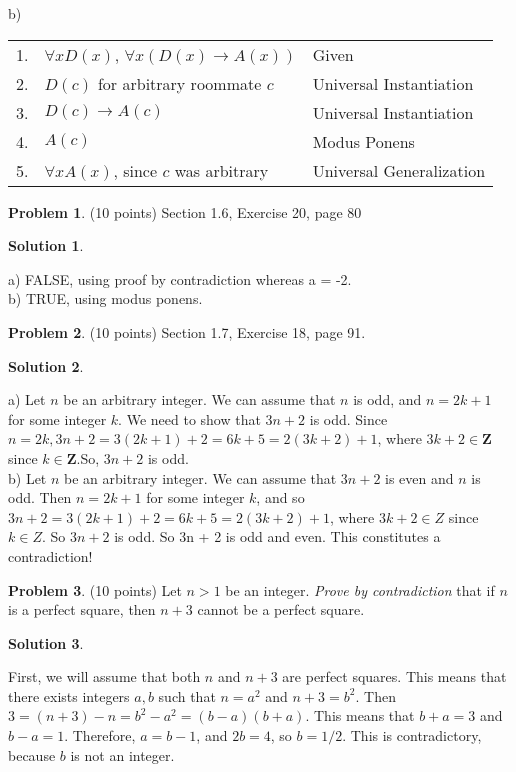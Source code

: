 \documentclass{article}
\theoremstyle{definition}
\newtheorem{problem}{Problem}
\newtheorem*{solution}{Solution}
\newcommand{\Z}{\mathbf{Z}}
\begin{document}
				b) 	\begin{tabular}{| l | l | l |} \hline
					1. & $\forall xD(x)$, $\forall x(D(x) \rightarrow A(x))$		& Given \\
					2. & $D(c)$ for arbitrary roommate $c$ 				& Universal Instantiation \\
					3. & $D(c) \rightarrow A(c) $						& Universal Instantiation \\
					4. & $A(c)$									& Modus Ponens \\
					5. & $\forall xA(x)$, since $c$ was arbitrary			& Universal Generalization \\
					\hline
					\end{tabular}

\begin{problem} (10 points)
Section 1.6, Exercise 20, page 80
\end{problem}
\begin{solution}
\end{solution}		\noindent a) FALSE, using proof by contradiction whereas a = -2. \\
				b) TRUE, using modus ponens.

\begin{problem} (10 points)
Section 1.7, Exercise 18, page 91.
\end{problem}
\begin{solution}
\end{solution}		\noindent a) Let $n$ be an arbitrary integer. We can assume that $n$ is odd, and $n = 2k					+1$ for some integer $k$. We need to show that $3n+2$ is odd. Since $n = 2k, 3n+2 = 3(2k				+1)+2 = 6k+5 = 2(3k+2)+1$, where $3k+2 \in\Z$ since $k \in \Z. $So, $3n+2$ is odd. \\ 

				\noindent b) Let $n$ be an arbitrary integer. We can assume that $3n + 2$ is 							even and $n$ is odd. Then $n = 2k + 1$ for some integer $k$, and so $3n + 2 = 3(2k + 1) + 				2 = 6k + 5 = 2(3k + 2) + 1$, where $3k + 2 \in Z$ since $k \in Z$. So $3n + 2$ is odd. So 3n 				+ 2 is odd and even. This constitutes a contradiction!

\begin{problem} (10 points)
Let $n>1$ be an integer. \textsl{Prove by contradiction} that if $n$ is a perfect square, then
$n+3$ cannot be a perfect square. 
\end{problem}
\begin{solution}
\end{solution}		\noindent First, we will assume that both $n$ and $n+3$ are perfect squares. This means 					that there exists integers $a,b$ such that $n = a^2$ and $n+3 = b^2$. Then $3 = (n+3) - n = 				b^2 - a^2 = (b-a)(b+a)$. This means that $b+a = 3$ and $b-a = 1$. Therefore, $a = b-1$, 					and $2b = 4$, so $b = 1/2$. This is contradictory, because $b$ is not an integer.
\end{document}
